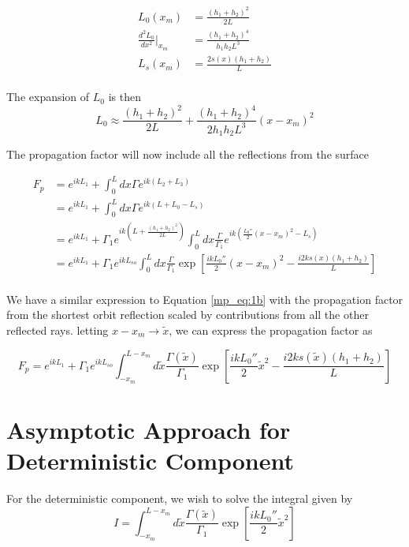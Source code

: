 \begin{equation}
\begin{aligned}
L_0(x_m) &= \frac{(h_1+h_2)^2}{2L} \\
\frac{d^2L_0}{dx^2}\big|_{x_m}  &= \frac{(h_1+h_2)^4}{h_1h_2L^3} \\
L_s(x_m) &= \frac{2s(x)(h_1 + h_2)}{L}\\
\end{aligned}
\label{mp_eq:17a}
\end{equation}

The expansion of $L_0$ is then
\begin{equation}
L_0 \approx \frac{(h_1+h_2)^2}{2L} + \frac{(h_1+h_2)^4}{2h_1h_2L^3}(x-x_m)^2
\label{mp_eq:18}
\end{equation}

The propagation factor will now include all the reflections from the surface

\begin{equation}
\begin{aligned}
F_p &= e^{ikL_1} + \int_0^Ldx\Gamma  e^{ik(L_2+L_3)}\\
&= e^{ikL_1} + \int_0^Ldx\Gamma  e^{ik(L+L_0-L_s)}\\
&= e^{ikL_1} +  \Gamma_1e^{ik(L+\frac{(h_1+h_2)^2}{2L})}\int_0^Ldx\frac{\Gamma}{\Gamma_1} e^{ik(\frac{L_0''}{2}(x-x_m)^2-L_s)}\\
&= e^{ikL_1} + \Gamma_1e^{ikL_{so}}\int_0^Ldx\frac{\Gamma}{\Gamma_1} \exp\left[\frac{ikL_0''}{2}(x-x_m)^2 - \frac{i2ks(x)(h_1+h_2)}{L}\right]\\
\end{aligned}
\label{mp_eq:20}
\end{equation}

We have a similar expression to Equation \ref{mp_eq:1b} with the propagation factor from the shortest orbit reflection scaled by contributions from all the other reflected rays. letting $x-x_m \rightarrow \tilde{x}$, we can express the propagation factor as

\begin{equation}
\boxed{F_p = e^{ikL_1} + \Gamma_1 e^{ikL_{so}}\int_{-x_m}^{L-x_m}d\tilde{x} \frac{\Gamma(\tilde{x})}{\Gamma_1}\exp\left[\frac{ikL_0''}{2}\tilde{x}^2 - \frac{i2ks(\tilde{x})(h_1+h_2)}{L}\right]}
\label{mp_eq:21}
\end{equation}

\section{Asymptotic Approach for Deterministic Component}
For the deterministic component, we wish to solve the integral given by
\begin{equation}
I = \int_{-x_m}^{L-x_m}d\tilde{x} \frac{\Gamma(\tilde{x})}{\Gamma_1}\exp\left[\frac{ikL_0''}{2}\tilde{x}^2\right]
\label{mp_eq:22}
\end{equation}

